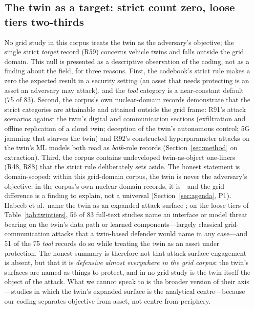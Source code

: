 \documentclass[preprint,12pt]{elsarticle}
\renewcommand{\_}{\plainunderscore\allowbreak}
\begin{document}
\subsection{The twin as a target: strict count zero, loose tiers two-thirds}\label{sec:targettiers}

No grid study in this corpus treats the twin as the adversary's objective; the single strict
\emph{target} record (R59) concerns vehicle twins and falls outside the grid domain.
This null is presented as a descriptive observation of the coding, not as a finding about
the field, for three reasons. First, the
codebook's strict rule makes a zero the expected result in a security setting (an asset
that needs protecting is an asset an adversary may attack), and the \emph{tool} category
is a near-constant default (75 of 83). Second, the corpus's own nuclear-domain records
demonstrate that the strict categories are attainable and
attained outside the grid frame: R91's attack scenarios against the twin's digital and
communication sections (exfiltration and offline replication of a cloud twin; deception
of the twin's autonomous control; 5G jamming that starves the twin) and R92's constructed
hyperparameter attacks on the twin's ML models both read as \emph{both}-role records
(Section~\ref{sec:method} on extraction). Third, the corpus contains undeveloped
twin-as-object one-liners (R48, R88) that the strict rule deliberately sets aside. The
honest statement is domain-scoped: within this grid-domain corpus, the twin is never the
adversary's objective; in the corpus's own nuclear-domain records, it is---and the grid
difference is a finding to explain, not a universal (Section~\ref{sec:agenda}, P1).
Habeeb et al.\ name the twin as an expanded attack surface
\cite{habeeb2026}; on the loose tiers of Table~\ref{tab:twintiers}, 56 of 83 full-text
studies name an interface or model threat bearing on the twin's data path or learned
components---largely
classical grid-communication attacks that a twin-based defender would name in any case---and
51 of the 75 \emph{tool} records do so while treating the twin as an asset under protection.
The honest summary is therefore not that attack-surface engagement is absent, but that it
is \emph{defensive almost everywhere in the grid corpus}: the twin's surfaces are named as
things to protect,
and in no grid study is the twin itself the object of the attack. What we cannot speak to
is the broader version of their axis---studies in which the twin's expanded surface is the
analytical centre---because our coding separates objective from asset, not centre from
periphery.
\end{document}
